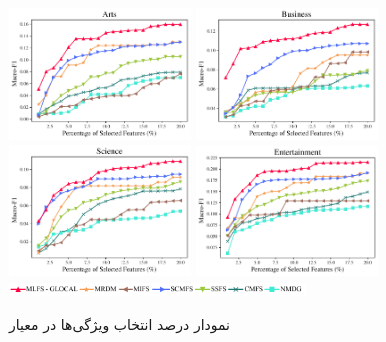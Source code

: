 \begin{figure}
	\centering
	{\includegraphics[width=0.43\textwidth]{figures/Macro/PSF(Arts).pdf}}
	{\includegraphics[width=0.43\textwidth]{figures/Macro/PSF(Business).pdf}}
	\\
	{\includegraphics[width=0.43\textwidth]{figures/Macro/PSF(Science).pdf}}
	{\includegraphics[width=0.43\textwidth]{figures/Macro/PSF(Entertainment).pdf}}
	{\includegraphics[width=0.7\textwidth]{figures/Micro/FL.pdf}}
	\caption{نمودار درصد انتخاب ویژگی‌ها در معیار  }
	\label{fig:fmac}
\end{figure}

